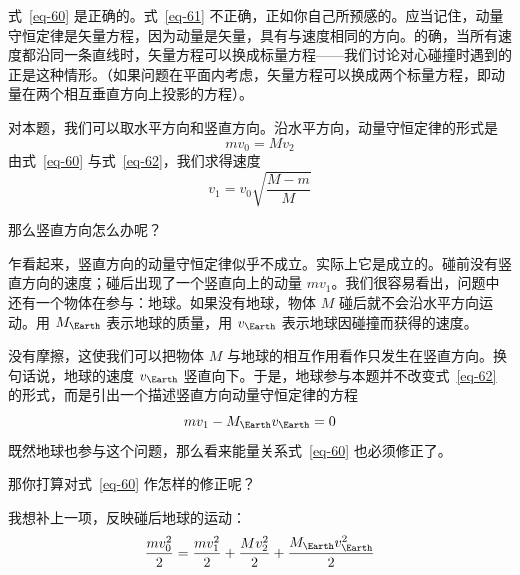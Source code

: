\begin{dialogue}
\tchr 式~\eqref{eq-60} 是正确的。式~\eqref{eq-61} 不正确，正如你自己所预感的。应当记住，动量守恒定律是矢量方程，因为动量是矢量，具有与速度相同的方向。的确，当所有速度都沿同一条直线时，矢量方程可以换成标量方程——我们讨论对心碰撞时遇到的正是这种情形。（如果问题在平面内考虑，矢量方程可以换成两个标量方程，即动量在两个相互垂直方向上投影的方程）。

对本题，我们可以取水平方向和竖直方向。沿水平方向，动量守恒定律的形式是
\begin{equation}%
mv_{0}= Mv_{2}
\label{eq-62}
\end{equation}
由式~\eqref{eq-60} 与式~\eqref{eq-62}，我们求得速度
\begin{equation*}%
v_{1} = v_{0}\sqrt{\frac{M-m}{M}}
\end{equation*}

\stdb 那么竖直方向怎么办呢？

\tchr 乍看起来，竖直方向的动量守恒定律似乎不成立。实际上它是成立的。碰前没有竖直方向的速度；碰后出现了一个竖直向上的动量 $mv_{1}$。我们很容易看出，问题中还有一个物体在参与：地球。如果没有地球，物体 $M$ 碰后就不会沿水平方向运动。用 $M_{\Earth}$ 表示地球的质量，用 $v_{\Earth}$ 表示地球因碰撞而获得的速度。

没有摩擦，这使我们可以把物体 $M$ 与地球的相互作用看作只发生在竖直方向。换句话说，地球的速度 $v_{\Earth}$ 竖直向下。于是，地球参与本题并不改变式~\eqref{eq-62} 的形式，而是引出一个描述竖直方向动量守恒定律的方程
\begin{equation}%
mv_{1}  - M_{\Earth}v_{\Earth} = 0
\label{eq-63}
\end{equation}
\stdb 既然地球也参与这个问题，那么看来能量关系式~\eqref{eq-60} 也必须修正了。

\tchr 那你打算对式~\eqref{eq-60} 作怎样的修正呢？

\stdb 我想补上一项，反映碰后地球的运动：
\begin{equation}%
\frac{mv_{0}^{2}}{2} = \frac{mv_{1}^{2}}{2} + \frac{Mv_{2}^{2}}{2} +  \frac{M_{\Earth}v_{\Earth}^{2}}{2}
\label{eq-64}
\end{equation}


\end{dialogue}
